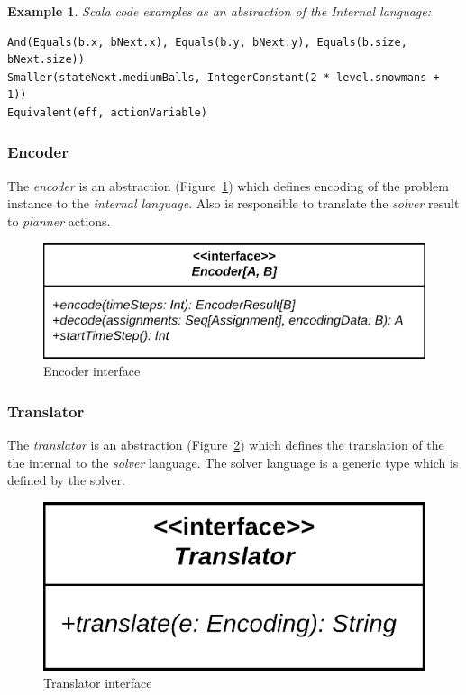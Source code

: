 \documentclass{report}
\theoremstyle{plain}
\newtheorem{example}{Example}[section]
\begin{document}
\vspace{1\baselineskip}

\begin{example} 
Scala code examples as an abstraction of the \emph{Internal language}:
\begin{lstlisting}
And(Equals(b.x, bNext.x), Equals(b.y, bNext.y), Equals(b.size, bNext.size))
Smaller(stateNext.mediumBalls, IntegerConstant(2 * level.snowmans + 1))
Equivalent(eff, actionVariable)
\end{lstlisting}
\end{example}

\subsubsection{Encoder}
The \emph{encoder} is an abstraction (Figure~\ref{fig:encoder-interface}) which defines encoding of the problem instance to the \emph{internal language}. Also is responsible to translate the \emph{solver} result to \emph{planner} actions. 

\begin{figure}
    \centering
    \includegraphics[scale=0.25]{encoder-interface.png}
    \caption{Encoder interface}
    \label{fig:encoder-interface}
\end{figure}

\subsubsection{Translator}
The \emph{translator} is an abstraction (Figure~\ref{fig:translator-interface}) which defines the translation of the the internal  to the \emph{solver} language. The solver language is a generic type which is defined by the solver.

\begin{figure}
    \centering
    \includegraphics[scale=0.25]{translator-interface.png}
    \caption{Translator interface}
    \label{fig:translator-interface}
\end{figure}
\end{document}
